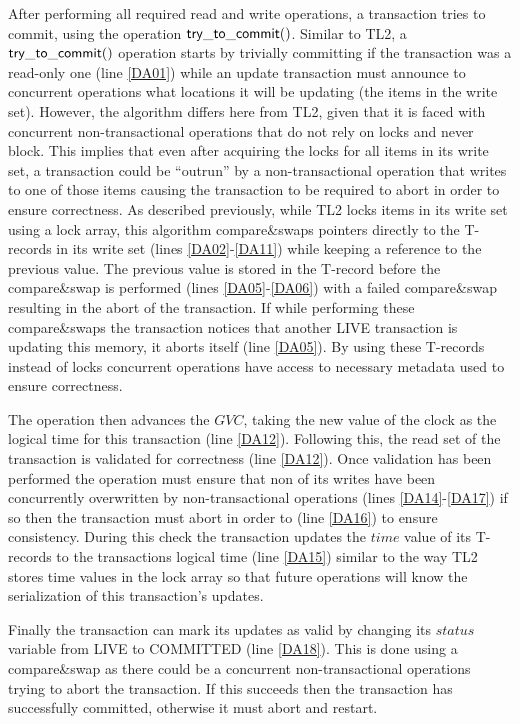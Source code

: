 After  performing all  required read  and write  operations,  a transaction
tries to commit, using the operation  ${\sf try\_to\_commit()}$.
Similar to TL2, a ${\sf try\_to\_commit()}$ operation 
starts by trivially committing if the transaction was a read-only one 
(line \ref{DA01}) while
an update transaction must announce to concurrent operations what locations it will be updating
(the items in the write set).
However, the algorithm  differs 
here from TL2, given that 
it is faced with concurrent non-transactional operations
that do not rely on locks and never block. 
This implies 
that even after acquiring the locks for all items in its write set, 
a transaction could be {}``outrun'' by 
a non-transactional operation that writes to one of those items
causing the transaction to be required to abort in order to ensure correctness. 
As described previously, while TL2 locks items in its write set using a
lock array, this algorithm compare\&swaps pointers directly to the T-records
in its write set (lines \ref{DA02}-\ref{DA11}) while keeping a reference to the previous value.
The previous value is stored in the T-record before the compare\&swap is performed (lines \ref{DA05}-\ref{DA06})
with a failed compare\&swap resulting in the abort of the transaction.
If while performing these compare\&swaps the transaction notices
that another LIVE transaction is updating this memory, it aborts itself
(line \ref{DA05}).
By using these T-records instead of locks concurrent operations have access to necessary metadata
used to ensure correctness.

The operation then advances the $\mathit{GVC}$, taking the
new value of the clock as the logical time for this transaction (line \ref{DA12}).
Following this, the read set of the transaction is validated for
correctness  (line \ref{DA12}). %
Once validation has been performed the operation must
ensure that non of its writes have been concurrently
overwritten by non-transactional operations (lines \ref{DA14}-\ref{DA17})
if so then the transaction must abort in order to (line \ref{DA16}) to ensure consistency.
During this check the transaction updates the $\mathit{time}$
value of its T-records to the transactions logical time (line \ref{DA15})
similar to the way TL2 stores time values in the lock array
so that future operations will know the serialization of this transaction's updates.

Finally the
transaction can mark its updates as valid by 
changing its 
$\mathit{status}$ variable from LIVE to COMMITTED (line \ref{DA18}).
This is done using a compare\&swap as there could be
a concurrent non-transactional operations trying to abort the transaction.  
If this succeeds then the transaction has successfully committed, otherwise
it must abort and restart.


